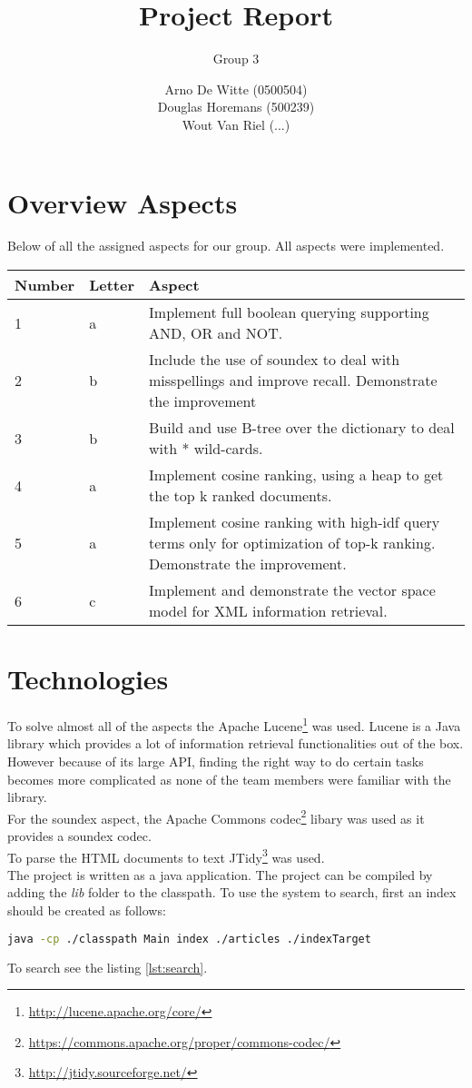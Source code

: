\documentclass{article}
\title{Project Report}
\subtitle{Group 3}
\author{Arno De Witte (0500504)\\Douglas Horemans (500239)\\Wout Van Riel (...)}
\begin{document}
\maketitle


\section{Overview Aspects}
Below of all the assigned aspects for our group. All aspects were implemented. \\
\begin{center}
	\begin{tabular}{ | l | l | p{10cm} |}
		\hline
		Number & Letter & Aspect                                                                    \\ \hline
		1      & a      & Implement full boolean querying supporting AND, OR and NOT.               \\ \hline
		2      & b      & Include the use of soundex to deal with misspellings and improve recall.
		Demonstrate the improvement \\ \hline
		3      & b      & Build and use B-tree over the dictionary to deal with * wild-cards.       \\ \hline
		4      & a      & Implement cosine ranking, using a heap to get the top k ranked documents. \\ \hline
		5      & a      & Implement cosine ranking with high-idf query terms only for optimization
		of top-k ranking. Demonstrate the improvement. \\ \hline
		6      & c      & Implement and demonstrate the vector space model for XML information
		retrieval. \\
		\hline
	\end{tabular}
\end{center}

\section{Technologies}
To solve almost all of the aspects the Apache Lucene\footnote{\url{http://lucene.apache.org/core/}} was used. Lucene is a Java library which provides a lot of information retrieval functionalities out of the box. However because of its large API, finding the right way to do certain tasks becomes more complicated as none of the team members were familiar with the library. \\
For the soundex aspect, the Apache Commons codec\footnote{\url{https://commons.apache.org/proper/commons-codec/}} libary was used as it provides a soundex codec.\\
To parse the HTML documents to text JTidy\footnote{\url{http://jtidy.sourceforge.net/}} was used.\\
The project is written as a java application. The project can be compiled by adding the \emph{lib} folder to the classpath. To use the system to search, first an index should be created as follows:
\begin{lstlisting}[language=Bash]
java -cp ./classpath Main index ./articles ./indexTarget
\end{lstlisting}
To search see the listing \ref{lst:search}.
\end{document}
